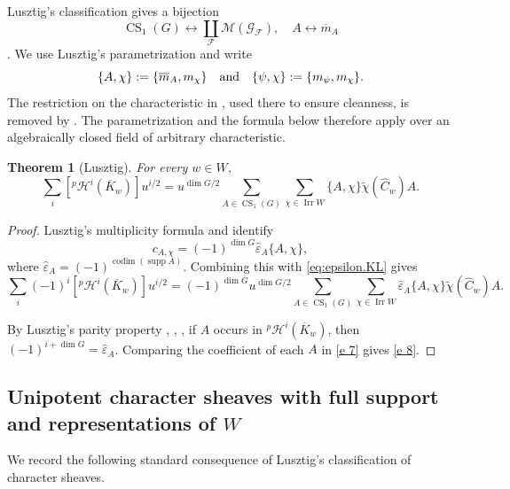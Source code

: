 \documentclass[11pt]{amsart}
\numberwithin{equation}{section}
\newtheorem{theorem}{Theorem}[section]
\theoremstyle{definition}
\def\and{\quad{\rm and}\quad}
\def\beq{\begin{equation}}
\def\eeq{\end{equation}}
\DeclareMathOperator{\Irr}{\mathrm{Irr}}
\DeclareMathOperator{\CS}{\mathrm{CS}}
\DeclareMathOperator{\codim}{\mathrm{codim}}
\DeclareMathOperator{\supp}{\mathrm{supp}}
\def\cH{\mathcal {H}}
\begin{document}
Lusztig's classification gives a bijection
\beq\label{eq:family}
\CS_1(G)\longleftrightarrow\coprod_{\mathscr F}\mathscr M(\mathscr G_{\mathscr F}), \quad A\leftrightarrow\overline m_A
\eeq
\cite[Theorem~23.1]{Lus86v}.
We use Lusztig's parametrization and write
\[
\{A,\chi\}:=\{\overline m_A,m_\chi\}
\and
\{\psi,\chi\}:=\{m_{\psi},m_\chi\}.
\]
The restriction on the characteristic in \cite[(23.0.1)]{Lus86v}, used there to ensure cleanness, is removed by \cite[Theorem~1.2 and Section~3.10]{Lus12}.
The parametrization and the formula below therefore apply over an algebraically closed field of arbitrary characteristic.

\begin{theorem}[Lusztig]\label{p coefficient}
For every $w\in W$,
\begin{equation}\label{e 8}
\sum_i[{}^p\cH^i(\overline K_w)]u^{i/2}
=u^{\dim G/2}
\sum_{A\in\CS_1(G)}\sum_{\chi\in\Irr W}
\{A,\chi\}\widetilde\chi(\widehat C_w)A.
\end{equation}
\end{theorem}
\begin{proof}
Lusztig's multiplicity formula \cite[Corollary~14.11]{Lus85ii} and \cite[Theorem~23.1]{Lus86v} identify
\[
c_{A,\chi} = (-1)^{\dim G}\widehat\varepsilon_A\{A,\chi\},
\]
where $\widehat\varepsilon_A=(-1)^{\codim(\supp A)}$.
Combining this with \eqref{eq:epsilon.KL} gives
\begin{equation}\label{e 7}
\sum_i(-1)^i[{}^p\cH^i(\overline K_w)]u^{i/2}
=(-1)^{\dim G}u^{\dim G/2}
\sum_{A\in\CS_1(G)}\sum_{\chi\in\Irr W}
\widehat\varepsilon_A\{A,\chi\}
\widetilde\chi(\widehat C_w)A.
\end{equation}

By Lusztig's parity property \cite[Sections~15.11--15.13]{Lus85ii}, \cite[Theorem~23.1]{Lus86v}, \cite[Section~3.10]{Lus12},
if $A$ occurs in ${}^p\cH^i(\overline K_w)$, then $(-1)^{i+\dim G}=\widehat\varepsilon_A$.
Comparing the coefficient of each $A$ in \eqref{e 7} gives \eqref{e 8}.
\end{proof}





\subsection{Unipotent character sheaves with full support and representations of $W$}\label{ss:fullsupp}
We record the following standard consequence of Lusztig's classification of character sheaves. 
\end{document}
